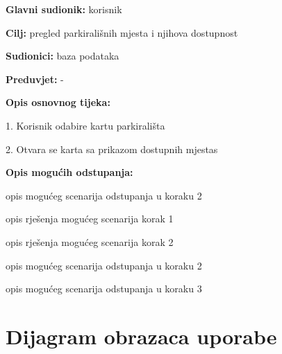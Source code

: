 					\noindent {}
					\begin{packed_item}
						
						\item \textbf{Glavni sudionik: }korisnik
						\item  \textbf{Cilj:} pregled parkirališnih mjesta i njihova dostupnost
						\item  \textbf{Sudionici:} baza podataka
						\item  \textbf{Preduvjet:} -
						\item  \textbf{Opis osnovnog tijeka:}
						
						\item[] \begin{packed_enum}
							
							\item 1. Korisnik odabire kartu parkirališta
							\item 2. Otvara se karta sa prikazom dostupnih mjestas
						\end{packed_enum}
						
						\item  \textbf{Opis mogućih odstupanja:}
						
						\item[] \begin{packed_item}
							
							\item[2.a] opis mogućeg scenarija odstupanja u koraku 2
							\item[] \begin{packed_enum}
								
								\item opis rješenja mogućeg scenarija korak 1
								\item opis rješenja mogućeg scenarija korak 2
								
							\end{packed_enum}
							\item[2.b] opis mogućeg scenarija odstupanja u koraku 2
							\item[3.a] opis mogućeg scenarija odstupanja  u koraku 3
							
						\end{packed_item}
					\end{packed_item}

				\section{Dijagram obrazaca uporabe} 
			
